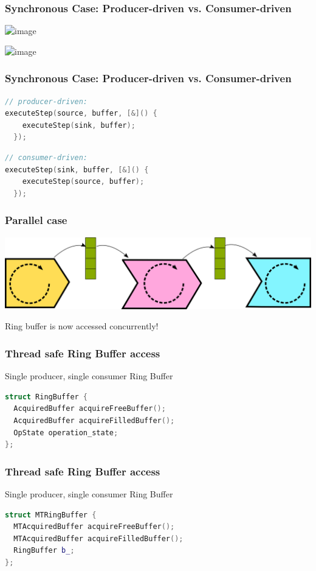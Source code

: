 \documentclass[aspectratio=169]{beamer}
\begin{document}
\begin{frame}[fragile]
  \frametitle{Synchronous Case: Producer-driven vs. Consumer-driven}

  \includegraphics<1>[width=.9\textwidth]{pipelinesgfx/pipe_pd_000.png}

  \includegraphics<2>[width=.9\textwidth]{pipelinesgfx/pipe_cd_000.png}
\end{frame}

\begin{frame}[fragile]
  \frametitle{Synchronous Case: Producer-driven vs. Consumer-driven}
  
  \begin{lstlisting}[language={C++}]
// producer-driven:
executeStep(source, buffer, [&]() {
    executeStep(sink, buffer);
  });
  \end{lstlisting}

\begin{lstlisting}[language={C++}]
// consumer-driven:
executeStep(sink, buffer, [&]() {
    executeStep(source, buffer);
  });
  \end{lstlisting}
\end{frame}

\begin{frame}[fragile]
  \frametitle{Parallel case}
  
  \includegraphics[width=.9\textwidth]{pipelinesgfx/pipe_parallel.png}
  
  Ring buffer is now accessed concurrently!
  
\end{frame}

\begin{frame}[fragile]
  \frametitle{Thread safe Ring Buffer access}
  
  Single producer, single consumer Ring Buffer

  \begin{lstlisting}[language={C++}]
struct RingBuffer {
  AcquiredBuffer acquireFreeBuffer();
  AcquiredBuffer acquireFilledBuffer();
  OpState operation_state;
};
  \end{lstlisting}
\end{frame}

\begin{frame}[fragile]
  \frametitle{Thread safe Ring Buffer access}
  
  Single producer, single consumer Ring Buffer

  \begin{lstlisting}[language={C++}]
struct MTRingBuffer {
  MTAcquiredBuffer acquireFreeBuffer();
  MTAcquiredBuffer acquireFilledBuffer();
  RingBuffer b_;
};
  \end{lstlisting}
\end{frame}
\end{document}
